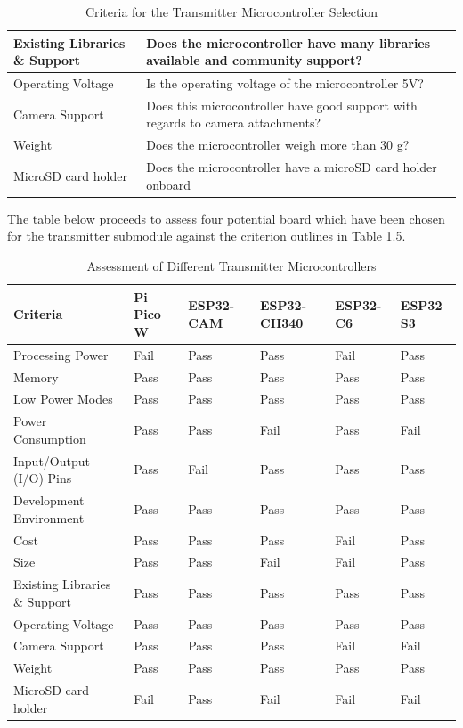 \documentclass[class=report,11pt,crop=false]{standalone}
\begin{document}
\begin{table}[ht]
\centering
\begin{tabular}{|l|p{10cm}|}
\hline
Existing Libraries \& Support & Does the microcontroller have many libraries available and community support? \\
\hline
Operating Voltage & Is the operating voltage of the microcontroller 5V? \\
\hline
Camera Support & Does this microcontroller have good support with regards to camera attachments? \\
\hline
Weight & Does the microcontroller weigh more than 30 g? \\
\hline
MicroSD card holder & Does the microcontroller have a microSD card holder onboard \\
\hline
\end{tabular}
\caption{Criteria for the Transmitter Microcontroller Selection}
\label{tab:microcontroller_criteria2}
\end{table}

The table below proceeds to assess four potential board which have been chosen for the transmitter submodule against the criterion outlines in Table 1.5.

\begin{table}[ht]
\centering
\begin{tabular}{|p{3.5cm}|l|l|l|l|l|}
\hline
\textbf{Criteria} & \textbf{Pi Pico W} & \textbf{ESP32-CAM} & \textbf{ESP32-CH340} & \textbf{ESP32-C6} & \textbf{ESP32 S3} \\
\hline
Processing Power & Fail & Pass & Pass & Fail & Pass \\
\hline
Memory & Pass & Pass & Pass & Pass & Pass \\
\hline
Low Power Modes & Pass & Pass & Pass & Pass & Pass \\
\hline
Power Consumption & Pass & Pass & Fail & Pass & Fail \\
\hline
Input/Output (I/O) Pins & Pass & Fail & Pass & Pass & Pass \\
\hline
Development Environment & Pass & Pass & Pass & Pass & Pass \\
\hline
Cost & Pass & Pass & Pass & Fail & Pass \\
\hline
Size & Pass & Pass & Fail & Fail & Pass \\
\hline
Existing Libraries \& Support & Pass & Pass & Pass & Pass & Pass \\
\hline
Operating Voltage & Pass & Pass & Pass & Pass & Pass \\
\hline
Camera Support & Pass & Pass & Pass & Fail & Fail \\
\hline
Weight & Pass & Pass & Pass & Pass & Pass \\
\hline
MicroSD card holder & Fail & Pass & Fail & Fail & Fail \\
\hline
\end{tabular}
\caption{Assessment of Different Transmitter Microcontrollers}
\label{tab:microcontroller_assessment1}
\end{table}
\end{document}
